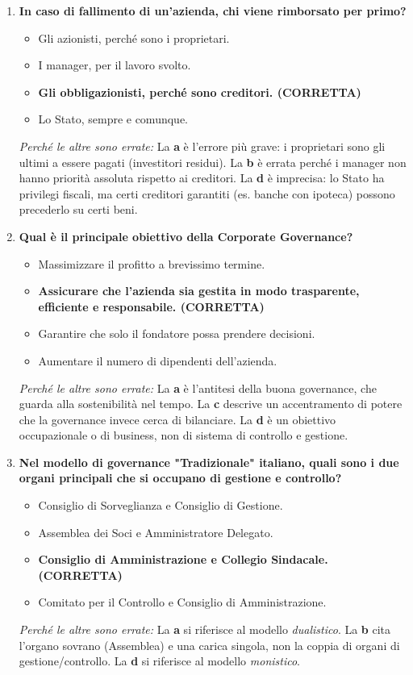 \documentclass[a4paper,12pt]{article}
\begin{document}
\begin{enumerate}
		\item \textbf{In caso di fallimento di un'azienda, chi viene rimborsato per primo?}
		\begin{itemize}
			\item[a)] Gli azionisti, perché sono i proprietari.
			\item[b)] I manager, per il lavoro svolto.
			\item[c)] \textbf{Gli obbligazionisti, perché sono creditori. (CORRETTA)}
			\item[d)] Lo Stato, sempre e comunque.
		\end{itemize}
		\textit{Perché le altre sono errate:} La \textbf{a} è l'errore più grave: i proprietari sono gli ultimi a essere pagati (investitori residui). La \textbf{b} è errata perché i manager non hanno priorità assoluta rispetto ai creditori. La \textbf{d} è imprecisa: lo Stato ha privilegi fiscali, ma certi creditori garantiti (es. banche con ipoteca) possono precederlo su certi beni.
		
		\item \textbf{Qual è il principale obiettivo della Corporate Governance?}
		\begin{itemize}
			\item[a)] Massimizzare il profitto a brevissimo termine.
			\item[b)] \textbf{Assicurare che l'azienda sia gestita in modo trasparente, efficiente e responsabile. (CORRETTA)}
			\item[c)] Garantire che solo il fondatore possa prendere decisioni.
			\item[d)] Aumentare il numero di dipendenti dell'azienda.
		\end{itemize}
		\textit{Perché le altre sono errate:} La \textbf{a} è l'antitesi della buona governance, che guarda alla sostenibilità nel tempo. La \textbf{c} descrive un accentramento di potere che la governance invece cerca di bilanciare. La \textbf{d} è un obiettivo occupazionale o di business, non di sistema di controllo e gestione.
		
		\item \textbf{Nel modello di governance "Tradizionale" italiano, quali sono i due organi principali che si occupano di gestione e controllo?}
		\begin{itemize}
			\item[a)] Consiglio di Sorveglianza e Consiglio di Gestione.
			\item[b)] Assemblea dei Soci e Amministratore Delegato.
			\item[c)] \textbf{Consiglio di Amministrazione e Collegio Sindacale. (CORRETTA)}
			\item[d)] Comitato per il Controllo e Consiglio di Amministrazione.
		\end{itemize}
		\textit{Perché le altre sono errate:} La \textbf{a} si riferisce al modello \textit{dualistico}. La \textbf{b} cita l'organo sovrano (Assemblea) e una carica singola, non la coppia di organi di gestione/controllo. La \textbf{d} si riferisce al modello \textit{monistico}.
		
	\end{enumerate}
\end{document}
